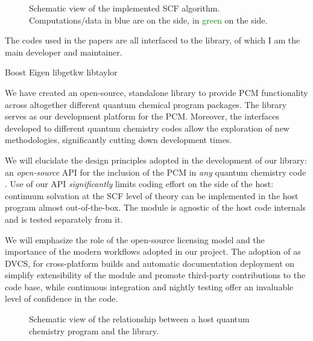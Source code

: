 \begin{figure}[!htb]
\centering
\scalebox{0.8}{}
\caption[Modular approach to programming a \acs{PCM} functionality into an existing \acs{SCF} code.]{
  Schematic view of the implemented SCF algorithm. Computations/data in
  \textcolor{PMS2229}{blue} are on the \pcmsolver side, in
  \textcolor{Green}{green} on the \DIRAC side.
  }
\label{fig:algorithm}
\end{figure}



The codes used in the papers are all interfaced to the \pcmsolver library,
of which I am the main developer and maintainer.

Boost\autocite{boost}
Eigen\autocite{eigen}
libgetkw\autocite{libgetkw}
libtaylor\autocite{libtaylor}


We have created an open-source, standalone library to provide \acs{PCM}
functionality across altogether different quantum chemical program
packages.
The library serves as our development platform for the \acs{PCM}.
Moreover, the interfaces developed to different quantum chemistry codes
allow the exploration of new methodologies, significantly cutting down
development times.


We will elucidate the design principles adopted in the development of our
\pcmsolver library: an \emph{open-source} \acs{API} for the inclusion of the
PCM in \emph{any} quantum chemistry code \cite{PCMSolver}.  Use of our
\acs{API} \emph{significantly} limits coding effort on the side of the host:
continuum solvation at the \acs{SCF}
level of theory can be implemented in the host program almost out-of-the-box.  The module is
agnostic of the host code internals and is tested separately from it.

We will emphasize the role of the open-source licensing model and the
importance of the modern workflows adopted in our project.  The adoption
of \git as \acs{DVCS}, \cmake for cross-platform builds and automatic
documentation deployment on \readthedocs simplify extensibility of the
module and promote third-party contributions to the code base, while
continuous integration and nightly testing offer an invaluable level of
confidence in the code.

\begin{figure}[tb]
  \centering
  \scalebox{0.8}{}
  \caption[Schematic view of the relationship between a host quantum chemistry
  program and the \pcmsolver library.]{
  Schematic view of the relationship between a host quantum chemistry
  program and the \pcmsolver library.
  }
\end{figure}

